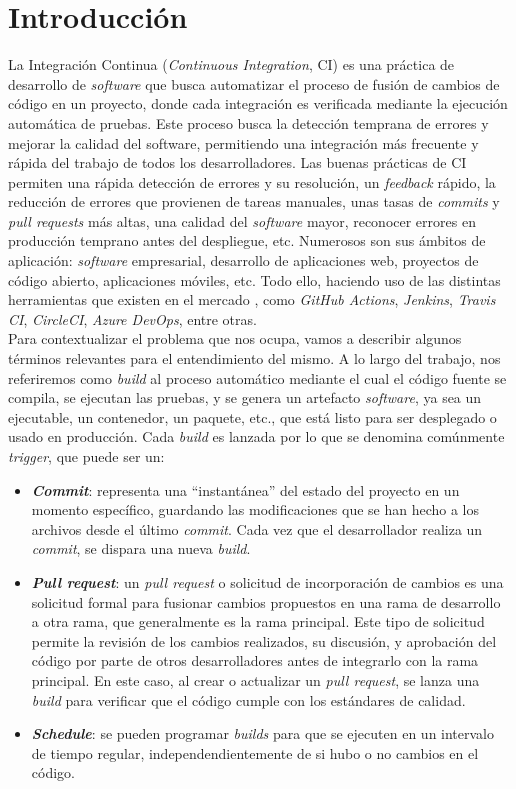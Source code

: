 \section{Introducción}
La Integración Continua (\textit{Continuous Integration}, CI) es una práctica de desarrollo de
\textit{software} que busca automatizar el proceso de fusión de cambios de código en un proyecto,
donde cada integración es verificada mediante la ejecución automática de pruebas. Este proceso
busca la detección temprana de errores y mejorar la calidad del software, permitiendo una
integración más frecuente y rápida del trabajo de todos los desarrolladores. Las buenas prácticas
de CI \cite{8} permiten una rápida detección de errores y su resolución, un
\textit{feedback} rápido, la reducción de errores que provienen de tareas manuales, unas tasas de
\textit{commits} y \textit{pull requests} más altas, una calidad del \textit{software} mayor,
reconocer errores en producción temprano antes del despliegue, etc. Numerosos son sus ámbitos
de aplicación: \textit{software} empresarial, desarrollo de aplicaciones web, proyectos de código
abierto, aplicaciones móviles, etc. Todo ello, haciendo uso de las distintas herramientas que
existen en el mercado \cite{9}, como \textit{GitHub Actions}, \textit{Jenkins},
\textit{Travis CI}, \textit{CircleCI}, \textit{Azure DevOps}, entre otras.\\

Para contextualizar el problema que nos ocupa, vamos a describir algunos términos relevantes para
el entendimiento del mismo. A lo largo del trabajo, nos referiremos como \textit{build} al 
proceso automático mediante el cual el código fuente se compila, se ejecutan las pruebas, y se
genera un artefacto \textit{software}, ya sea un ejecutable, un contenedor, un paquete, etc., que
está listo para ser desplegado o usado en producción. Cada \textit{build} es lanzada por lo
que se denomina comúnmente \textit{trigger}, que puede ser un:
\begin{itemize}
    \item \textbf{\textit{Commit}}: representa una ``instantánea'' del estado del proyecto en 
    un momento específico, guardando las modificaciones que se han hecho a los archivos desde el
    último \textit{commit}. Cada vez que el desarrollador realiza un \textit{commit}, se dispara
    una nueva \textit{build}.
    \item \textbf{\textit{Pull request}}: un \textit{pull request} o solicitud de incorporación
    de cambios es una solicitud formal para fusionar cambios propuestos en una rama de desarrollo
    a otra rama, que generalmente es la rama principal. Este tipo de solicitud permite la
    revisión de los cambios realizados, su discusión, y aprobación del código por parte de
    otros desarrolladores antes de integrarlo con la rama principal. En este caso, al crear o
    actualizar un \textit{pull request}, se lanza una \textit{build} para verificar que el código
    cumple con los estándares de calidad.
    \item \textbf{\textit{Schedule}}: se pueden programar \textit{builds} para que se ejecuten
    en un intervalo de tiempo regular, independendientemente de si hubo o no cambios en el código.
\end{itemize}

